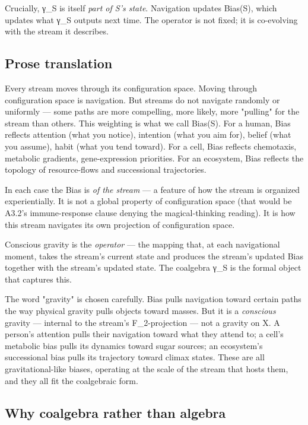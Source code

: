 \documentclass[11pt, openany]{book}
\begin{document}
Crucially, γ\_\allowbreak{}S is itself \textit{part of S's state}. Navigation updates Bias(S), which updates what γ\_\allowbreak{}S outputs next time. The operator is not fixed; it is co-evolving with the stream it describes.

\subsection{Prose translation}

Every stream moves through its configuration space. Moving through configuration space is navigation. But streams do not navigate randomly or uniformly --- some paths are more compelling, more likely, more "pulling" for the stream than others. This weighting is what we call Bias(S). For a human, Bias reflects attention (what you notice), intention (what you aim for), belief (what you assume), habit (what you tend toward). For a cell, Bias reflects chemotaxis, metabolic gradients, gene-expression priorities. For an ecosystem, Bias reflects the topology of resource-flows and successional trajectories.

In each case the Bias is \textit{of the stream} --- a feature of how the stream is organized experientially. It is not a global property of configuration space (that would be A3.2's immune-response clause denying the magical-thinking reading). It is how this stream navigates its own projection of configuration space.

Conscious gravity is the \textit{operator} --- the mapping that, at each navigational moment, takes the stream's current state and produces the stream's updated Bias together with the stream's updated state. The coalgebra γ\_\allowbreak{}S is the formal object that captures this.

The word "gravity" is chosen carefully. Bias pulls navigation toward certain paths the way physical gravity pulls objects toward masses. But it is a \textit{conscious} gravity --- internal to the stream's F\_\allowbreak{}2-projection --- not a gravity on X. A person's attention pulls their navigation toward what they attend to; a cell's metabolic bias pulls its dynamics toward sugar sources; an ecosystem's successional bias pulls its trajectory toward climax states. These are all gravitational-like biases, operating at the scale of the stream that hosts them, and they all fit the coalgebraic form.

\subsection{Why coalgebra rather than algebra}
\end{document}
